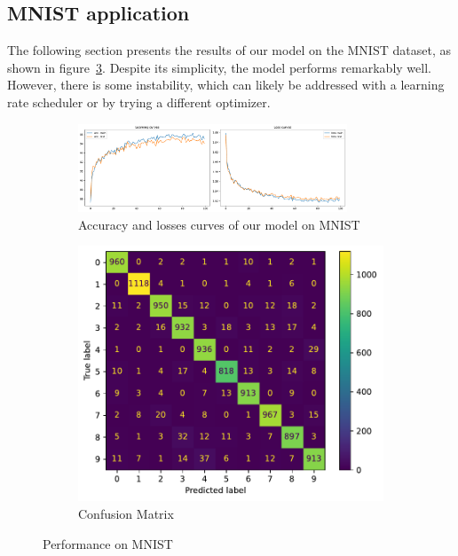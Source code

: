 \subsection{MNIST application}
The following section presents the results of our model on the MNIST dataset, as shown in figure~\ref{fig:mnist}. Despite its simplicity, the model performs remarkably well. However, there is some instability, which can likely be addressed with a learning rate scheduler or by trying a different optimizer.

\begin{figure}[H]
    \centering
    \begin{subfigure}{\textwidth}
        \centering
        \includegraphics[width=0.88\textwidth]{figs/NN/mnist_acc_loss.pdf}
        \caption{Accuracy and losses curves of our model on MNIST}
        \label{subfig:mnist_acc_loss}
    \end{subfigure}
    \begin{subfigure}{0.45\textwidth}
        \centering
        \includegraphics[width=\textwidth]{figs/NN/mnist_cm.pdf}
        \caption{Confusion Matrix}
        \label{subfig:mnist_cm}
    \end{subfigure}
    \caption{Performance on MNIST}
    \label{fig:mnist}
\end{figure}


